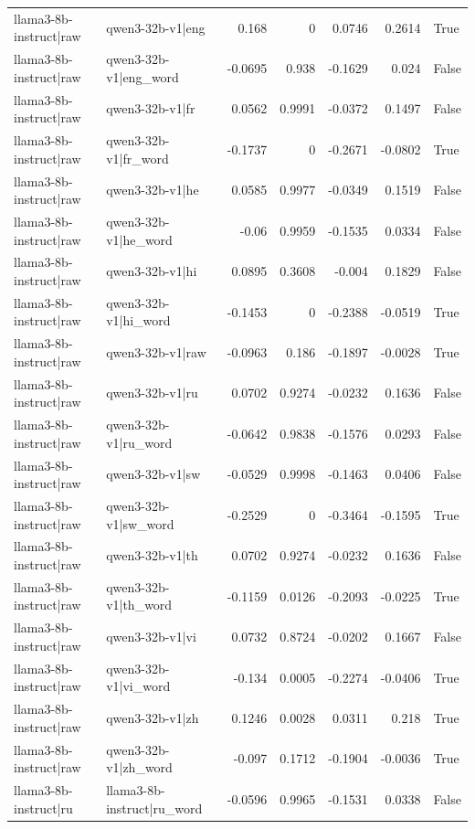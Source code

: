 \begin{table}
\begin{tabular}{l l r r r r l}
llama3-8b-instruct|raw & qwen3-32b-v1|eng & 0.168 & 0 & 0.0746 & 0.2614 & True \\
llama3-8b-instruct|raw & qwen3-32b-v1|eng_word & -0.0695 & 0.938 & -0.1629 & 0.024 & False \\
llama3-8b-instruct|raw & qwen3-32b-v1|fr & 0.0562 & 0.9991 & -0.0372 & 0.1497 & False \\
llama3-8b-instruct|raw & qwen3-32b-v1|fr_word & -0.1737 & 0 & -0.2671 & -0.0802 & True \\
llama3-8b-instruct|raw & qwen3-32b-v1|he & 0.0585 & 0.9977 & -0.0349 & 0.1519 & False \\
llama3-8b-instruct|raw & qwen3-32b-v1|he_word & -0.06 & 0.9959 & -0.1535 & 0.0334 & False \\
llama3-8b-instruct|raw & qwen3-32b-v1|hi & 0.0895 & 0.3608 & -0.004 & 0.1829 & False \\
llama3-8b-instruct|raw & qwen3-32b-v1|hi_word & -0.1453 & 0 & -0.2388 & -0.0519 & True \\
llama3-8b-instruct|raw & qwen3-32b-v1|raw & -0.0963 & 0.186 & -0.1897 & -0.0028 & True \\
llama3-8b-instruct|raw & qwen3-32b-v1|ru & 0.0702 & 0.9274 & -0.0232 & 0.1636 & False \\
llama3-8b-instruct|raw & qwen3-32b-v1|ru_word & -0.0642 & 0.9838 & -0.1576 & 0.0293 & False \\
llama3-8b-instruct|raw & qwen3-32b-v1|sw & -0.0529 & 0.9998 & -0.1463 & 0.0406 & False \\
llama3-8b-instruct|raw & qwen3-32b-v1|sw_word & -0.2529 & 0 & -0.3464 & -0.1595 & True \\
llama3-8b-instruct|raw & qwen3-32b-v1|th & 0.0702 & 0.9274 & -0.0232 & 0.1636 & False \\
llama3-8b-instruct|raw & qwen3-32b-v1|th_word & -0.1159 & 0.0126 & -0.2093 & -0.0225 & True \\
llama3-8b-instruct|raw & qwen3-32b-v1|vi & 0.0732 & 0.8724 & -0.0202 & 0.1667 & False \\
llama3-8b-instruct|raw & qwen3-32b-v1|vi_word & -0.134 & 0.0005 & -0.2274 & -0.0406 & True \\
llama3-8b-instruct|raw & qwen3-32b-v1|zh & 0.1246 & 0.0028 & 0.0311 & 0.218 & True \\
llama3-8b-instruct|raw & qwen3-32b-v1|zh_word & -0.097 & 0.1712 & -0.1904 & -0.0036 & True \\
llama3-8b-instruct|ru & llama3-8b-instruct|ru_word & -0.0596 & 0.9965 & -0.1531 & 0.0338 & False \\

\end{tabular}
\end{table}
